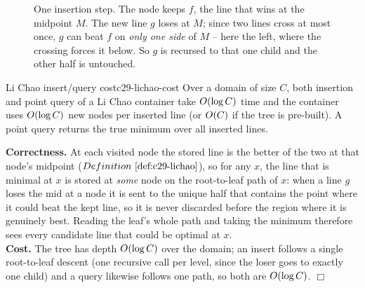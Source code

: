 \begin{figure}[H]
\centering
{}
\caption{One insertion step.  The node keeps \(f\), the line that wins at the
midpoint \(M\).  The new line \(g\) loses at \(M\); since two lines cross at
most once, \(g\) can beat \(f\) on \emph{only one side} of \(M\) -- here the
left, where the crossing forces it below.  So \(g\) is recursed to that one
child and the other half is untouched.}
\label{fig:c29-lichao}
\end{figure}

\begin{theorem}{Li Chao insert/query cost}{c29-lichao-cost}
Over a domain of size \(C\), both insertion and point query of a Li Chao
container take \(O(\log C)\) time and the container uses \(O(\log C)\)
new nodes per inserted line (or \(O(C)\) if the tree is pre-built).  A point
query returns the true minimum over all inserted lines.
\end{theorem}
\begin{proofbox}
\textbf{Correctness.} At each visited node the stored line is the better of the
two at that node's midpoint (\(\defref{c29-lichao}\)), so for any \(x\), the line
that is minimal at \(x\) is stored at \emph{some} node on the root-to-leaf path
of \(x\): when a line \(g\) loses the mid at a node it is sent to the unique
half that contains the point where it could beat the kept line, so it is never
discarded before the region where it is genuinely best.  Reading the leaf's whole
path and taking the minimum therefore sees every candidate line that could be
optimal at \(x\).\\
\textbf{Cost.} The tree has depth \(O(\log C)\) over the domain; an insert
follows a single root-to-leaf descent (one recursive call per level, since the
loser goes to exactly one child) and a query likewise follows one path, so both
are \(O(\log C)\). \(\Box\)
\end{proofbox}

